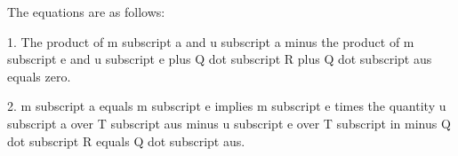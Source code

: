 The equations are as follows:

1. The product of m subscript a and u subscript a minus the product of m subscript e and u subscript e plus Q dot subscript R plus Q dot subscript aus equals zero.

2. m subscript a equals m subscript e implies m subscript e times the quantity u subscript a over T subscript aus minus u subscript e over T subscript in minus Q dot subscript R equals Q dot subscript aus.